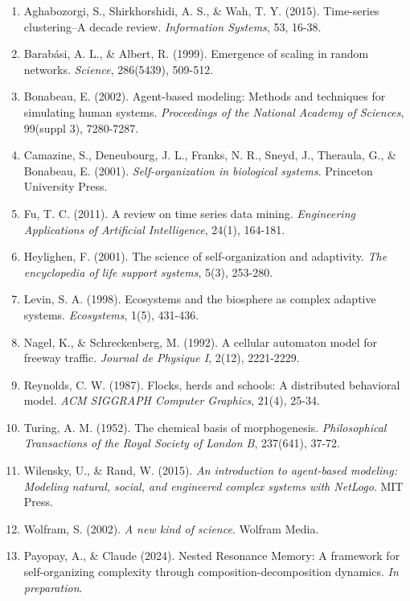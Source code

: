 \documentclass[
]{article}
\begin{document}
\begin{enumerate}
\def\labelenumi{\arabic{enumi}.}
\item
  Aghabozorgi, S., Shirkhorshidi, A. S., \& Wah, T. Y. (2015).
  Time-series clustering--A decade review. \emph{Information Systems},
  53, 16-38.
\item
  Barabási, A. L., \& Albert, R. (1999). Emergence of scaling in random
  networks. \emph{Science}, 286(5439), 509-512.
\item
  Bonabeau, E. (2002). Agent-based modeling: Methods and techniques for
  simulating human systems. \emph{Proceedings of the National Academy of
  Sciences}, 99(suppl 3), 7280-7287.
\item
  Camazine, S., Deneubourg, J. L., Franks, N. R., Sneyd, J., Theraula,
  G., \& Bonabeau, E. (2001). \emph{Self-organization in biological
  systems}. Princeton University Press.
\item
  Fu, T. C. (2011). A review on time series data mining.
  \emph{Engineering Applications of Artificial Intelligence}, 24(1),
  164-181.
\item
  Heylighen, F. (2001). The science of self-organization and adaptivity.
  \emph{The encyclopedia of life support systems}, 5(3), 253-280.
\item
  Levin, S. A. (1998). Ecosystems and the biosphere as complex adaptive
  systems. \emph{Ecosystems}, 1(5), 431-436.
\item
  Nagel, K., \& Schreckenberg, M. (1992). A cellular automaton model for
  freeway traffic. \emph{Journal de Physique I}, 2(12), 2221-2229.
\item
  Reynolds, C. W. (1987). Flocks, herds and schools: A distributed
  behavioral model. \emph{ACM SIGGRAPH Computer Graphics}, 21(4), 25-34.
\item
  Turing, A. M. (1952). The chemical basis of morphogenesis.
  \emph{Philosophical Transactions of the Royal Society of London B},
  237(641), 37-72.
\item
  Wilensky, U., \& Rand, W. (2015). \emph{An introduction to agent-based
  modeling: Modeling natural, social, and engineered complex systems
  with NetLogo}. MIT Press.
\item
  Wolfram, S. (2002). \emph{A new kind of science}. Wolfram Media.
\item
  Payopay, A., \& Claude (2024). Nested Resonance Memory: A framework
  for self-organizing complexity through composition-decomposition
  dynamics. \emph{In preparation}.
\end{enumerate}
\end{document}

